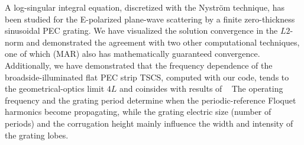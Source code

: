 \documentclass[conference]{IEEEtran}
\begin{document}
A log-singular integral equation, discretized with the Nystr\"om
technique, has been studied for the E-polarized plane-wave scattering by a
finite zero-thickness sinusoidal PEC grating.  We have visualized the solution 
convergence in the $L2$-norm and demonstrated the agreement with two other 
computational techniques, one of which (MAR) also has mathematically guaranteed 
convergence. Additionally, we have demonstrated that the frequency dependence of  
the broadside-illuminated flat PEC strip TSCS, computed with our code, tends to 
the geometrical-optics limit $4L$ and coinsides with results of ~\cite{shapoval2011}
The operating frequency and the grating period determine when the periodic-reference 
Floquet harmonics become propagating, while the grating electric size (number of periods)
and the corrugation height mainly influence the width and intensity of the
grating lobes.
\end{document}
